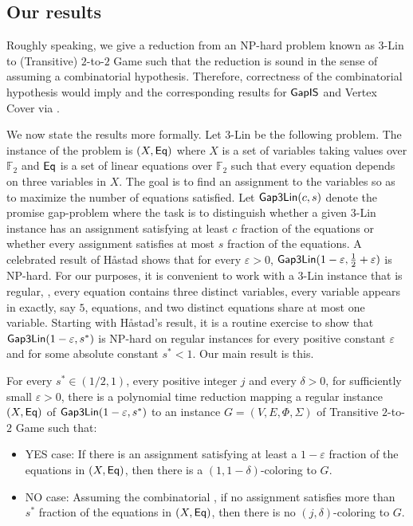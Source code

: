 \documentclass{toc}
\newcommand\eps{\varepsilon}
\begin{document}
\subsection{Our results}

Roughly speaking, we give a reduction from an NP-hard problem known as $3$-Lin to
(Transitive) $2$-to-$2$ Game such that
the reduction is sound in the sense of  assuming a
combinatorial hypothesis. Therefore, correctness of the combinatorial hypothesis would
imply 
and the corresponding results for ${\sf GapIS}$ and Vertex Cover via
.


We now state the results more formally. Let $3$-Lin be the following problem. The instance of the problem is
$(X, {\sf Eq})$ where $X$ is a set of variables taking values over ${\mathbb F}_2$ and ${\sf Eq}$ is a set of linear equations over
${\mathbb F}_2$ such that every equation depends on three variables in $X$. The goal is to find an assignment to the variables
so as to maximize the number of equations satisfied. Let ${\sf Gap3Lin}(c, s)$ denote the promise gap-problem
where the task is to distinguish whether a given $3$-Lin instance has an assignment satisfying at least $c$ fraction of
the equations or whether every assignment satisfies at most $s$ fraction of the equations.
A celebrated result of H\aa stad \cite{Has01} shows that for every  $\eps>0$, %
 ${\sf Gap3Lin}(1-\eps, \frac{1}{2}+\eps)$ is NP-hard. For our purposes, it is convenient to work with a $3$-Lin
 instance that is regular, \ie, every equation contains three distinct variables,  every variable appears in exactly, say $5$,
 equations, and two distinct equations share at most one variable.
 Starting with H\aa stad's result, it is a routine exercise to show that ${\sf Gap3Lin}(1-\eps, s^*)$ is NP-hard on regular instances for every positive
 constant $\eps$ and for some absolute constant $s^* < 1$.
 Our main result is this. %

\begin{theorem}\label{thm:main} For every $s^{*}\in (1/2,1)$, every positive integer $j$ and every
$\delta>0$, for sufficiently small $\eps>0$,
there is a
 polynomial time reduction mapping a regular instance
$(X, {\sf Eq})$ of ${\sf Gap3Lin}(1-\eps, s^*)$
to an instance $G=(V,E,\Phi,\Sigma)$ of Transitive $2$-to-$2$ Game
such that:
\begin{itemize}
\item
YES case: If there is an assignment satisfying at least
a  %
$1-\eps$ fraction of the equations
in $(X, {\sf Eq})$, then
there is a $(1,1-\delta)$-coloring to $G$.

\item NO case: Assuming the combinatorial ,
if no assignment satisfies more than $s^*$ fraction of the equations in $(X, {\sf Eq})$,
then there is no $(j,\delta)$-coloring to $G$.
\end{itemize}
\end{theorem}
\end{document}
